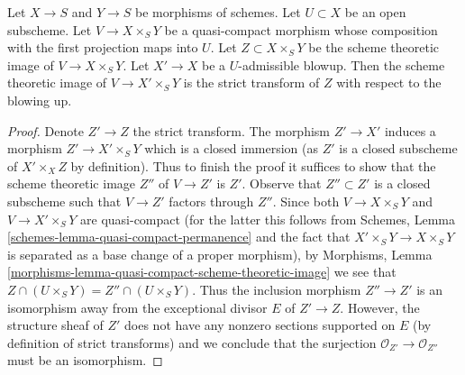 \begin{lemma}
\label{lemma-replaced-by-strict-transform}
Let $X \to S$ and $Y \to S$ be morphisms of schemes.
Let $U \subset X$ be an open subscheme.
Let $V \to X \times_S Y$ be a quasi-compact morphism
whose composition with the first projection maps into $U$.
Let $Z \subset X \times_S Y$ be the scheme theoretic image of
$V \to X \times_S Y$. Let $X' \to X$ be a $U$-admissible blowup.
Then the scheme theoretic image of $V \to X' \times_S Y$ is the
strict transform of $Z$ with respect to the blowing up.
\end{lemma}

\begin{proof}
Denote $Z' \to Z$ the strict transform. The morphism $Z' \to X'$
induces a morphism $Z' \to X' \times_S Y$ which is a closed immersion
(as $Z'$ is a closed subscheme of $X' \times_X Z$ by definition).
Thus to finish the proof it suffices to show that the scheme theoretic
image $Z''$ of $V \to Z'$ is $Z'$. Observe that $Z'' \subset Z'$
is a closed subscheme such that $V \to Z'$ factors through $Z''$.
Since both $V \to X \times_S Y$ and $V \to X' \times_S Y$ are
quasi-compact (for the latter this follows from Schemes, Lemma
\ref{schemes-lemma-quasi-compact-permanence}
and the fact that $X' \times_S Y \to X \times_S Y$ is separated
as a base change of a proper morphism), by Morphisms, Lemma
\ref{morphisms-lemma-quasi-compact-scheme-theoretic-image}
we see that $Z \cap (U \times_S Y) = Z'' \cap (U \times_S Y)$.
Thus the inclusion morphism $Z'' \to Z'$ is an isomorphism
away from the exceptional divisor $E$ of $Z' \to Z$. However, the
structure sheaf of $Z'$ does not have any nonzero sections supported
on $E$ (by definition of strict transforms) and we conclude that
the surjection $\mathcal{O}_{Z'} \to \mathcal{O}_{Z''}$
must be an isomorphism.
\end{proof}
